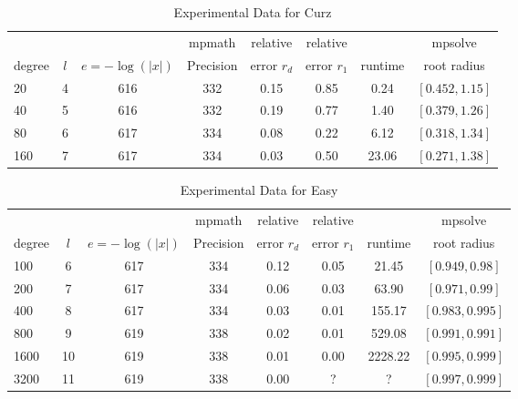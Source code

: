 \documentclass[sigconf]{acmart}
\begin{document}
\begin{table}[t]
\caption{Experimental Data for Curz}
\label{tab:curz}
\vskip 0.15in
\begin{center}
\begin{small}
\begin{sc}
\begin{tabular}{lccccccc}
\toprule
             &       &                       & mpmath   & relative       & relative       &               & mpsolve \\
degree  & $l$ & $e=-\log(|x|)$ & Precision & error $r_d$ & error $r_1$ & runtime & root radius\\
\midrule
   20 & 4 & 616 & 332 & 0.15 & 0.85 & 0.24   & $[0.452, 1.15]$ \\
   40 & 5 & 616 & 332 & 0.19 & 0.77 & 1.40   & $[0.379, 1.26]$\\
   80 & 6 & 617 & 334 & 0.08 & 0.22 & 6.12   & $[0.318, 1.34]$\\
 160 & 7 & 617 & 334 & 0.03 & 0.50 & 23.06 & $[0.271, 1.38]$\\
\bottomrule
\end{tabular}
\end{sc}
\end{small}
\end{center}
\vskip -0.1in
\end{table}

\begin{table}[t]
\caption{Experimental Data for Easy}
\label{tab:easy}
\vskip 0.15in
\begin{center}
\begin{small}
\begin{sc}
\begin{tabular}{lccccccc}
\toprule
&  &  & mpmath & relative  & relative &  & mpsolve \\
degree  & $l$& $e=-\log(|x|)$& Precision &error $r_d$       & error $r_1$ &runtime& root radius\\
\midrule
  100 & 6 & 617 & 334 & 0.12 & 0.05 &   21.45 & $[0.949, 0.98]$ \\
  200 & 7 & 617 & 334 & 0.06 & 0.03 &   63.90 & $[0.971, 0.99]$\\
  400 & 8 & 617 & 334 & 0.03 & 0.01 & 155.17 & $[0.983, 0.995]$\\
  800 & 9 & 619 & 338 & 0.02 & 0.01 & 529.08 & $[0.991, 0.991]$\\
1600 &10& 619 & 338 & 0.01 & 0.00 & 2228.22 & $[0.995, 0.999]$\\
3200 &11& 619 & 338 & 0.00 & ? & ? & $[0.997, 0.999]$\\
\bottomrule
\end{tabular}
\end{sc}
\end{small}
\end{center}
\vskip -0.1in
\end{table}
\end{document}
